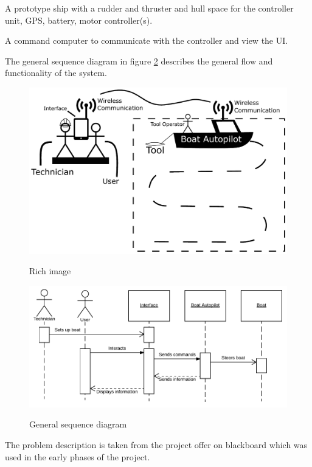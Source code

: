 A prototype ship with a rudder and thruster and hull space for the controller unit, GPS, battery, motor controller(s).

A command computer to communicate with the controller and view the UI.

The general sequence diagram in figure \ref{fig:general_sd} describes the general flow and functionality of the system.

\begin{figure}[H]
	\centering
	\includegraphics[width=1\linewidth]{Images/Introduction/rich_image}
	\label{fig:rich_image}
	\caption{Rich image}
\end{figure}

\begin{figure}[H]
	\centering
	\includegraphics[width=1\linewidth]{Images/Introduction/General_SD}
	\label{fig:general_sd}
	\caption{General sequence diagram}
\end{figure}

The problem description is taken from the project offer on blackboard\cite{problem-description} which was used in the early phases of the project.

